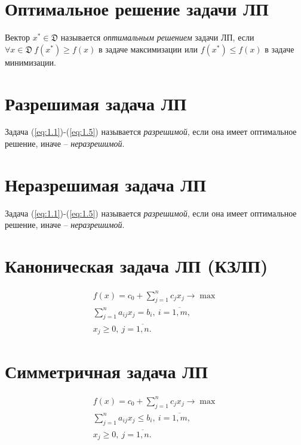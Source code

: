 \section{Оптимальное решение задачи ЛП}

\begin{definition}
	Вектор $x^{*} \in \mathfrak{D}$ называется \emph{оптимальным решением} задачи ЛП, если $\forall x \in \mathfrak{D} \ f(x^{*}) \geqslant f(x)$ в задаче максимизации или $f(x^{*}) \leqslant f(x)$ в задаче минимизации.
\end{definition}

\newpage

\section{Разрешимая задача ЛП}

\begin{definition}
	Задача (\ref{eq:1.1})-(\ref{eq:1.5}) называется \emph{разрешимой}, если она имеет оптимальное решение, иначе -- \emph{неразрешимой}.
\end{definition}

\section{Неразрешимая задача ЛП}

\begin{definition}
	Задача (\ref{eq:1.1})-(\ref{eq:1.5}) называется \emph{разрешимой}, если она имеет оптимальное решение, иначе -- \emph{неразрешимой}.
\end{definition}

\section{Каноническая задача ЛП (КЗЛП)}

\[
	\begin{array}{l}
		f(x) = c_0 + \sum_{j=1}^{n}c_jx_j \rightarrow \max   \\
		\sum_{j=1}^{n}a_{ij}x_j = b_i, \ i = \overline{1,m}, \\
		x_j \geqslant 0, \ j = \overline{1,n}.
	\end{array}
\]

\section{Симметричная задача ЛП}

\[
	\begin{array}{l}
		f(x) = c_0 + \sum_{j=1}^{n}c_jx_j \rightarrow \max           \\
		\sum_{j=1}^{n}a_{ij}x_j \leqslant b_i, \ i = \overline{1,m}, \\
		x_j \geqslant 0, \ j = \overline{1,n}.
	\end{array}
\]

